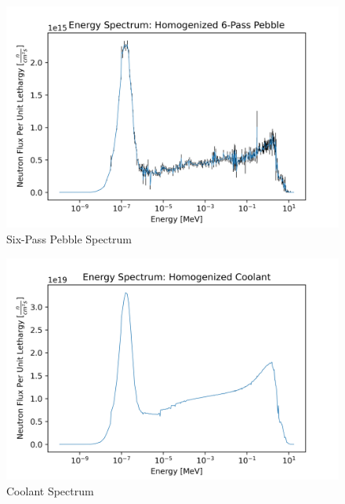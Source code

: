 \begin{figure}[H]
\centering
  \includegraphics[width=0.95\linewidth]{figures/6_spec_homog}
  \caption{Six-Pass Pebble Spectrum}
  \label{fig:hom-six}
\end{figure}

\begin{figure}[H]
\centering
  \includegraphics[width=0.95\linewidth]{figures/cool_spec_homog}
  \caption{Coolant Spectrum}
  \label{fig:hom-cool}
\end{figure}
